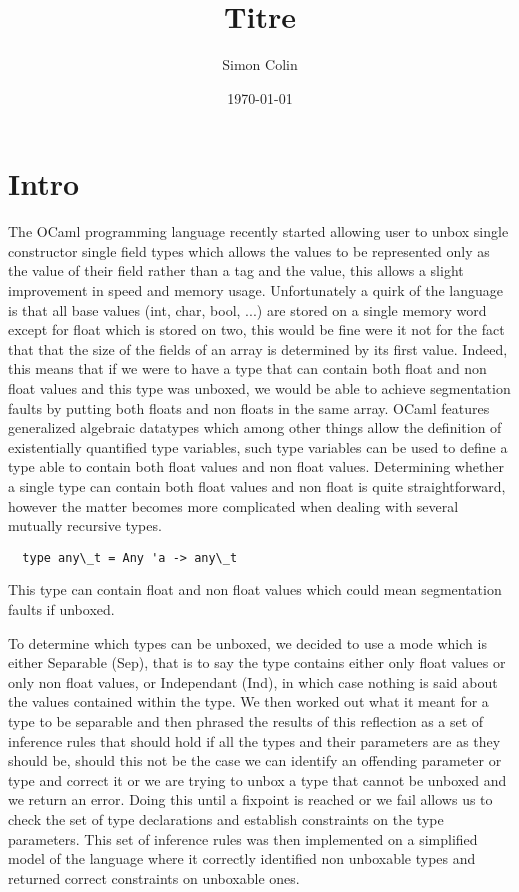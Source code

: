 \documentclass[a4]{article}
\title{Titre}
\author{Simon Colin}
\date{\today}
\begin{document}
\maketitle

\section{Intro}

The OCaml programming language recently started allowing user to unbox single constructor single field types which allows the values to be represented only as the value of their field rather than a tag and the value, this allows a slight improvement in speed and memory usage. Unfortunately a quirk of the language is that all base values (int, char, bool, ...) are stored on a single memory word except for float which is stored on two, this would be fine were it not for the fact that that the size of the fields of an array is determined by its first value. Indeed, this means that if we were to have a type that can contain both float and non float values and this type was unboxed, we would be able to achieve segmentation faults by putting both floats and non floats in the same array. OCaml features generalized algebraic datatypes which among other things allow the definition of existentially quantified type variables, such type variables can be used to define a type able to contain both float values and non float values. Determining whether a single type can contain both float values and non float is quite straightforward, however the matter becomes more complicated when dealing with several mutually recursive types.

\bigskip

\begin{lstlisting}
  type any\_t = Any 'a -> any\_t 
\end{lstlisting}
{\footnotesize This type can contain float and non float values which could mean segmentation faults if unboxed.}
\bigskip

To determine which types can be unboxed, we decided to use a mode which is either Separable (Sep), that is to say the type contains either only float values or only non float values, or Independant (Ind), in which case nothing is said about the values contained within the type. We then worked out what it meant for a type to be separable and then phrased the results of this reflection as a set of inference rules that should hold if all the types and their parameters are as they should be, should this not be the case we can identify an offending parameter or type and correct it or we are trying to unbox a type that cannot be unboxed and we return an error. Doing this until a fixpoint is reached or we fail allows us to check the set of type declarations and establish constraints on the type parameters. This set of inference rules was then implemented on a simplified model of the language where it correctly identified non unboxable types and returned correct constraints on unboxable ones.
\end{document}
